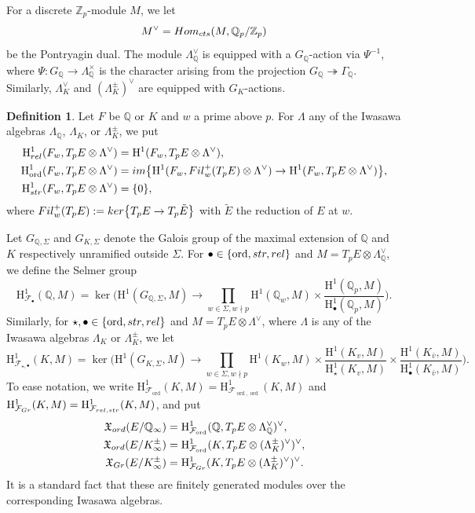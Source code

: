 \documentclass[a4paper,10pt]{amsart}
\numberwithin{equation}{section}
\numberwithin{equation}{section}
\theoremstyle{plain}
\theoremstyle{definition}
\newtheorem{defi}[thm]{Definition}
\theoremstyle{definition}
\theoremstyle{plain}
\theoremstyle{plain}
\theoremstyle{plain}
\theoremstyle{plain}
\DeclareMathOperator{\ord}{ord}
\newcommand{\Z}{\mathbb{Z}}
\newcommand{\Q}{\mathbb{Q}}
\newcommand{\X}{\mathfrak{X}}
\newcommand{\Fcal}{\mathcal{F}}
\newcommand{\rH}{\mathrm{H}}
\begin{document}
For a discrete $\Z_p$-module $M$, we let
\[
M^\vee={\rm Hom}_{\rm cts}(M,\Q_p/\Z_p)
\]
be the Pontryagin dual. The module $\Lambda_{\Q}^{\vee}$ is equipped with a $G_\Q$-action via $\Psi^{-1}$, where $\Psi:G_\Q\rightarrow\Lambda_{\Q}^\times$ is the character arising from the projection $G_\Q\twoheadrightarrow\Gamma_\Q$. Similarly, $\Lambda_K^{\vee}$ and $(\Lambda^\pm_K)^{\vee}$ are equipped with $G_K$-actions.

\begin{defi}\label{defilocalconds}
Let $F$ be $\Q$ or $K$ and $w$ a prime above $p$. For $\Lambda$ any of the Iwasawa algebras $\Lambda_\Q$, $\Lambda_K$, or $\Lambda_K^\pm$, 
we put
\begin{align*}
\rH^1_{\rm rel}(F_w,T_pE\otimes \Lambda^{\vee})&=\rH^1(F_w,T_pE\otimes \Lambda^{\vee}),\\
\rH^1_{\ord}(F_w,T_pE\otimes \Lambda^{\vee})&= {\rm im}\bigl\{\rH^1(F_w,{\rm Fil}_w^+(T_pE)\otimes \Lambda^{\vee})\rightarrow\rH^1(F_w,T_pE\otimes \Lambda^{\vee})\bigr\},\\
\rH^1_{\rm str}(F_w,T_pE\otimes \Lambda^{\vee})&=\{0\}, 
\end{align*}
where ${\rm Fil}_w^+(T_pE):={\rm ker}\bigl\{T_pE\rightarrow T_p\tilde{E}\bigr\}$ with $\tilde{E}$ the reduction of $E$ at $w$.
\end{defi}
Let $G_{\Q,\Sigma}$ and $G_{K,\Sigma}$ denote the Galois group of the maximal extension of $\Q$ and $K$ respectively unramified outside $\Sigma$. %
For $\bullet \in \{\ord, \rm str, \rm rel \}$ and $M=T_pE\otimes \Lambda_\Q^{\vee}$, we define the Selmer group
\begin{equation}
\rH^1_{\Fcal_{\bullet}}(\Q, M)=\ker \biggl(\rH^1(G_{\Q,\Sigma},M) \to \prod_{w\in\Sigma,w\nmid p}\rH^1(\Q_w, M)\times\frac{\rH^1(\Q_{p},M)}{\rH^1_{\bullet}(\Q_{p},M)}\biggr).
\end{equation}
Similarly, for $\star,\bullet \in \{\ord, \rm str, \rm rel \}$ and $M=T_pE\otimes\Lambda^{\vee}$, where $\Lambda$ is any of the Iwasawa algebras $\Lambda_K$ or $\Lambda_K^\pm$, we let
\begin{equation}\label{eq:defSelK}
\rH^1_{\Fcal_{\star,\bullet}}(K, M)=\ker \biggl(\rH^1(G_{K,\Sigma},M) \to \prod_{w\in\Sigma,w\nmid p}\rH^1(K_w, M)\times\frac{\rH^1(K_v,M)}{\rH^1_{\star}(K_v,M)}\times\frac{\rH^1(K_{\bar{v}},M)}{\rH^1_{\bullet}(K_{\bar{v}},M)}\biggr).
\end{equation}
To ease notation, we write $\rH^1_{\Fcal_{\ord}}(K, M)=\rH^1_{\Fcal_{\ord,\ord}}(K, M)$ and $\rH^1_{\Fcal_{\rm Gr}}(K, M)=\rH^1_{\Fcal_{\rm rel, str}}(K, M)$, and put
\begin{align*}
\X_{\rm ord}(E/\Q_{\infty})&=\rH^1_{\Fcal_{\ord}}(\Q, T_pE\otimes\Lambda_\Q^{\vee})^{\vee},\\
\X_{\rm ord}(E/K_\infty^\pm)&=\rH^1_{\Fcal_{\ord}}(K, T_pE\otimes (\Lambda^\pm_K)^{\vee})^{\vee},\\
\X_{\rm Gr}(E/K_\infty^\pm)&=\rH^1_{\Fcal_{\rm Gr}}(K, T_pE\otimes (\Lambda^\pm_K)^{\vee})^{\vee}.
\end{align*}
It is a standard fact that these are finitely generated modules over the corresponding Iwasawa algebras. 
\end{document}
